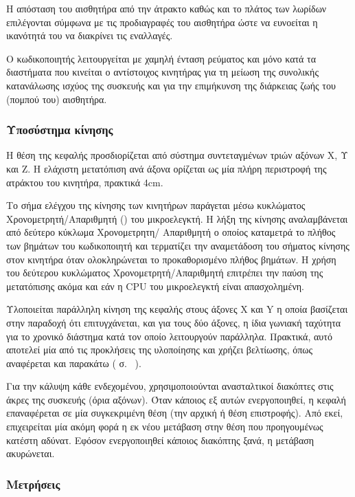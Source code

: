 Η απόσταση του αισθητήρα από την άτρακτο καθώς και το πλάτος των λωρίδων
επιλέγονται σύμφωνα με τις προδιαγραφές του αισθητήρα ώστε να ευνοείται η
ικανότητά του να διακρίνει τις εναλλαγές.

Ο κωδικοποιητής λειτουργείται με χαμηλή ένταση ρεύματος και μόνο κατά τα
διαστήματα που κινείται ο αντίστοιχος κινητήρας για τη μείωση της συνολικής
κατανάλωσης ισχύος της συσκευής και για την επιμήκυνση της διάρκειας ζωής του
(πομπού του) αισθητήρα.


\subsubsection{Υποσύστημα κίνησης}

Η θέση της κεφαλής προσδιορίζεται από σύστημα συντεταγμένων τριών αξόνων X, Υ
και Z. Η ελάχιστη μετατόπιση ανά άξονα ορίζεται ως μία πλήρη περιστροφή της
ατράκτου του κινητήρα, πρακτικά 4cm.

Το σήμα ελέγχου της κίνησης των κινητήρων παράγεται μέσω κυκλώματος
Χρονομετρητή\slash{}Απαριθμητή () του μικροελεγκτή.
Η λήξη της κίνησης αναλαμβάνεται από δεύτερο κύκλωμα Χρονομετρητη\slash{}%
Απαριθμητή ο οποίος καταμετρά το πλήθος των βημάτων του κωδικοποιητή και
τερματίζει την αναμετάδοση του σήματος κίνησης στον κινητήρα όταν ολοκληρώνεται
το προκαθορισμένο πλήθος βημάτων. Η χρήση του δεύτερου κυκλώματος
Χρονομετρητή\slash{}Απαριθμητή επιτρέπει την παύση της μετατόπισης ακόμα και εάν
η CPU του μικροελεγκτή είναι απασχολημένη.

Υλοποιείται παράλληλη κίνηση της κεφαλής στους άξονες X και Y η οποία βασίζεται
στην παραδοχή ότι επιτυγχάνεται, και για τους δύο άξονες, η ίδια γωνιακή
ταχύτητα για το χρονικό διάστημα κατά τον οποίο λειτουργούν παράλληλα. Πρακτικά,
αυτό αποτελεί μία από τις προκλήσεις της υλοποίησης και χρήζει βελτίωσης, όπως
αναφέρεται και παρακάτω ( σ.~%
\pageref{subsec:improvements}).

Για την κάλυψη κάθε ενδεχομένου, χρησιμοποιούνται ανασταλτικοί διακόπτες στις
άκρες της συσκευής (όρια αξόνων). Όταν κάποιος εξ αυτών ενεργοποιηθεί, η κεφαλή
επαναφέρεται σε μία συγκεκριμένη θέση (την αρχική ή θέση επιστροφής). Από εκεί,
επιχειρείται μία ακόμη φορά η εκ νέου μετάβαση στην θέση που προηγουμένως
κατέστη αδύνατ. Εφόσον ενεργοποιηθεί κάποιος διακόπτης ξανά, η μετάβαση
ακυρώνεται.


\subsubsection{Μετρήσεις}

